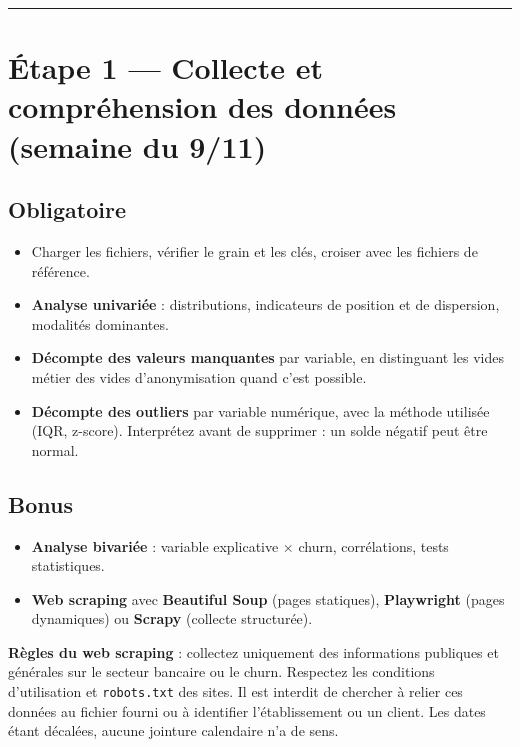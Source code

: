\documentclass[11pt,a4paper]{article}
\renewenvironment{quote}{\begin{quotebox}}{\end{quotebox}}
\providecommand{\tightlist}{\setlength{\itemsep}{0pt}\setlength{\parskip}{0pt}}
\begin{document}
\begin{center}\rule{0.5\linewidth}{0.5pt}\end{center}

\section{Étape 1 --- Collecte et compréhension des données (semaine du
9/11)}\label{uxe9tape-1-collecte-et-compruxe9hension-des-donnuxe9es-semaine-du-911}

\subsection{Obligatoire}\label{obligatoire}

\begin{itemize}
\tightlist
\item
  Charger les fichiers, vérifier le grain et les clés, croiser avec les
  fichiers de référence.
\item
  \textbf{Analyse univariée} : distributions, indicateurs de position et
  de dispersion, modalités dominantes.
\item
  \textbf{Décompte des valeurs manquantes} par variable, en distinguant
  les vides métier des vides d'anonymisation quand c'est possible.
\item
  \textbf{Décompte des outliers} par variable numérique, avec la méthode
  utilisée (IQR, z-score). Interprétez avant de supprimer : un solde
  négatif peut être normal.
\end{itemize}

\subsection{Bonus}\label{bonus}

\begin{itemize}
\tightlist
\item
  \textbf{Analyse bivariée} : variable explicative × churn,
  corrélations, tests statistiques.
\item
  \textbf{Web scraping} avec \textbf{Beautiful Soup} (pages statiques),
  \textbf{Playwright} (pages dynamiques) ou \textbf{Scrapy} (collecte
  structurée).
\end{itemize}

\begin{quote}
\textbf{Règles du web scraping} : collectez uniquement des informations
publiques et générales sur le secteur bancaire ou le churn. Respectez
les conditions d'utilisation et \texttt{robots.txt} des sites. Il est
interdit de chercher à relier ces données au fichier fourni ou à
identifier l'établissement ou un client. Les dates étant décalées,
aucune jointure calendaire n'a de sens.
\end{quote}
\end{document}
